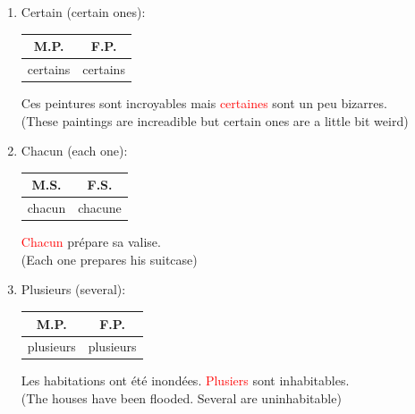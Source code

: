 \documentclass{book}
\begin{document}
\begin{enumerate}
            \item Certain (certain ones): 
                \begin{center}
                    \begin{tabular}{|c|c|}
                        \hline
                        \textbf{M.P.} & \textbf{F.P.} \\
                        \hline
                        certains & certains \\
                        \hline
                    \end{tabular}
                \end{center}
                \begin{center}
                    Ces peintures sont incroyables mais \textcolor{red}{certaines} sont un peu bizarres. \\
                    (These paintings are increadible but certain ones are a little bit weird)
                \end{center}

            \item Chacun (each one): 
                \begin{center}
                    \begin{tabular}{|c|c|}
                        \hline
                        \textbf{M.S.} & \textbf{F.S.} \\
                        \hline
                        chacun & chacune \\
                        \hline
                    \end{tabular}
                \end{center}
                \begin{center}
                    \textcolor{red}{Chacun} prépare sa valise. \\
                    (Each one prepares his suitcase)
                \end{center}

            \item Plusieurs (several):
                \begin{center}
                    \begin{tabular}{|c|c|}
                        \hline
                        \textbf{M.P.} & \textbf{F.P.} \\
                        \hline
                        plusieurs & plusieurs \\
                        \hline
                    \end{tabular}
                \end{center}
                \begin{center}
                    Les habitations ont été inondées. \textcolor{red}{Plusiers} sont inhabitables. \\
                    (The houses have been flooded. Several are uninhabitable)
                \end{center}


\end{enumerate}
\end{document}
